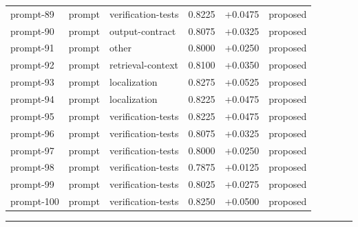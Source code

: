 \begin{center}
\begin{longtable}{llp{5.2cm}rrl}
prompt-89 & prompt & verification-tests & 0.8225 & +0.0475 & proposed \\
prompt-90 & prompt & output-contract & 0.8075 & +0.0325 & proposed \\
prompt-91 & prompt & other & 0.8000 & +0.0250 & proposed \\
prompt-92 & prompt & retrieval-context & 0.8100 & +0.0350 & proposed \\
prompt-93 & prompt & localization & 0.8275 & +0.0525 & proposed \\
prompt-94 & prompt & localization & 0.8225 & +0.0475 & proposed \\
prompt-95 & prompt & verification-tests & 0.8225 & +0.0475 & proposed \\
prompt-96 & prompt & verification-tests & 0.8075 & +0.0325 & proposed \\
prompt-97 & prompt & verification-tests & 0.8000 & +0.0250 & proposed \\
prompt-98 & prompt & verification-tests & 0.7875 & +0.0125 & proposed \\
prompt-99 & prompt & verification-tests & 0.8025 & +0.0275 & proposed \\
prompt-100 & prompt & verification-tests & 0.8250 & +0.0500 & proposed \\
\bottomrule\end{longtable}\end{center}
\par\bigskip\hrule\bigskip

